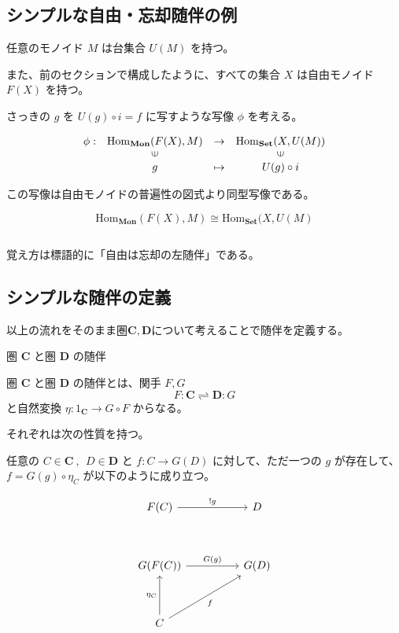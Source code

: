 \documentclass[uplatex,a4j,12pt,dvipdfmx]{jsarticle}
\begin{document}
\subsection{シンプルな自由・忘却随伴の例}

任意のモノイド $M$ は台集合 $U(M)$ を持つ。

また、前のセクションで構成したように、すべての集合 $X$ は自由モノイド $F(X)$ を持つ。

さっきの $g$ を $U(g) \circ i = f$ に写すような写像 $\phi$ を考える。

\[
	\begin{array}{cccc}
		\phi : & \mathrm{Hom}_{\mathbf{Mon}}(F(X), M) & \to     & \mathrm{Hom}_{\mathbf{Set}}(X, U(M)) \\
		       & \rotatebox{90}{${\in}$}              &         & \rotatebox{90}{${\in}$}              \\
		       & g                                    & \mapsto & U(g) \circ i
	\end{array}
\]

この写像は自由モノイドの普遍性の図式より同型写像である。

$$
	\mathrm{Hom}_{\mathbf{Mon}}(F(X), M) \cong \mathrm{Hom}_{\mathbf{Set}}(X, U(M)
$$

${}$

覚え方は標語的に「自由は忘却の左随伴」である。


\subsection{シンプルな随伴の定義}

以上の流れをそのまま圏$\mathbf{C},\mathbf{D}$について考えることで随伴を定義する。


\begin{itembox}[l]{圏 $\mathbf{C}$ と圏 $\mathbf{D}$ の随伴}

	圏 $\mathbf{C}$ と圏 $\mathbf{D}$ の随伴とは、関手 $F,G$
	$$
		F : \mathbf{C} \rightleftharpoons \mathbf{D}: G
	$$
	と自然変換
	$\eta: 1_{\mathbf{C}} \to G \circ F$
	からなる。

	それぞれは次の性質を持つ。

	任意の
	$C \in \mathbf{C} \ , \ \ D \in \mathbf{D}$
	と
	$f: C \to G(D)$
	に対して、ただ一つの $g$ が存在して、
	$f = G(g) \circ \eta_{C}$
	が以下のように成り立つ。

	\[
		\begin{tikzcd}
			F(C) \arrow[rr, "!g"]                       &  & D    \\
			&  &      \\
			G(F(C)) \arrow[rr, "G(g)"]                  &  & G(D) \\
			&  &      \\
			C \arrow[rruu, "f"'] \arrow[uu, "\eta_{C}"] &  &
		\end{tikzcd}
	\]

\end{itembox}
\end{document}
